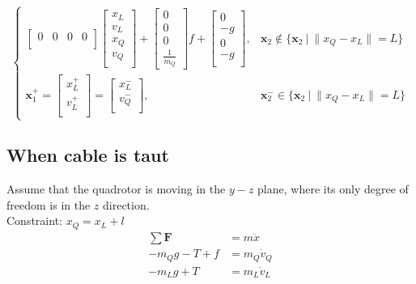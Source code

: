 \documentclass[11pt]{article}
\begin{document}
\[\begin{cases}
\begin{bmatrix}
       0 & 0 & 0 & 0 \\
\end{bmatrix}
\begin{bmatrix}
       x_L \\ {{v}}_L \\ {{x}}_Q \\ {{v}}_Q \\
\end{bmatrix}
+ 
\begin{bmatrix}
      0 \\
      0 \\
      0 \\
      \frac{1}{m_Q}
\end{bmatrix}
f
+ 
\begin{bmatrix}
       0 \\
       -g \\
       0 \\
       -g \\
\end{bmatrix},
& 
\mathbf{x}_2 \not\in \{ \mathbf{x}_2 \ | \  \| {x}_Q - {x}_L \| = L \} \\
\mathbf{x}_1^+ = 
\begin{bmatrix}
       {x}_L^+ \\ {v}_L^+ \\ 
\end{bmatrix}
= 
\begin{bmatrix}
       x_L^- \\
       v_Q^- \\
\end{bmatrix} , 
&  
\mathbf{x}_2^- \in \{ \mathbf{x}_2 \ | \  \| {x}_Q -  {x}_L \| = L \}
\end{cases}
\]





\newpage
\subsection{When cable is taut}

Assume that the quadrotor is moving in the $y-z$ plane, where its only degree of freedom is in the $z$ direction.  \\
Constraint: ${x}_Q = {x}_L + l$ \\


\begin{align*}
\sum \mathbf{F} &= m \ddot{x} \\
-m_Q g - T + f &= m_Q \dot{v}_Q \\
-m_L g + T &= m_L \dot{v}_L
\end{align*}
\end{document}
